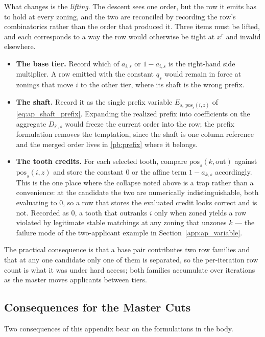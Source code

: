 \documentclass{article}
\begin{document}
What changes is the \emph{lifting}. The descent sees one order, but the row it emits has to hold at every zoning, and the two are reconciled by recording the row's combinatorics rather than the order that produced it. Three items must be lifted, and each corresponds to a way the row would otherwise be tight at $x^r$ and invalid elsewhere.
\begin{itemize}
    \item \textbf{The base tier.} Record which of $a_{i,s}$ or $1 - a_{i,s}$ is the right-hand side multiplier. A row emitted with the constant $q_s$ would remain in force at zonings that move $i$ to the other tier, where its shaft is the wrong prefix.
    \item \textbf{The shaft.} Record it as the single prefix variable $E_{s,\, \mathrm{pos}_s(i,z)}$ of \eqref{eq:ap_shaft_prefix}. Expanding the realized prefix into coefficients on the aggregate $D_{i',s}$ would freeze the current order into the row; the prefix formulation removes the temptation, since the shaft is one column reference and the merged order lives in \eqref{pb:prefix} where it belongs.
    \item \textbf{The tooth credits.} For each selected tooth, compare $\mathrm{pos}_s(k,\mathrm{out})$ against $\mathrm{pos}_s(i,z)$ and store the constant $0$ or the affine term $1 - a_{k,s}$ accordingly. This is the one place where the collapse noted above is a trap rather than a convenience: at the candidate the two are numerically indistinguishable, both evaluating to $0$, so a row that stores the evaluated credit looks correct and is not. Recorded as $0$, a tooth that outranks $i$ only when zoned yields a row violated by legitimate stable matchings at any zoning that unzones $k$ --- the failure mode of the two-applicant example in Section~\ref{app:ap_variable}.
\end{itemize}
The practical consequence is that a base pair contributes two row families and that at any one candidate only one of them is separated, so the per-iteration row count is what it was under hard access; both families accumulate over iterations as the master moves applicants between tiers.

\subsection{Consequences for the Master Cuts}
\label{app:ap_consequences}

Two consequences of this appendix bear on the formulations in the body.
\end{document}
